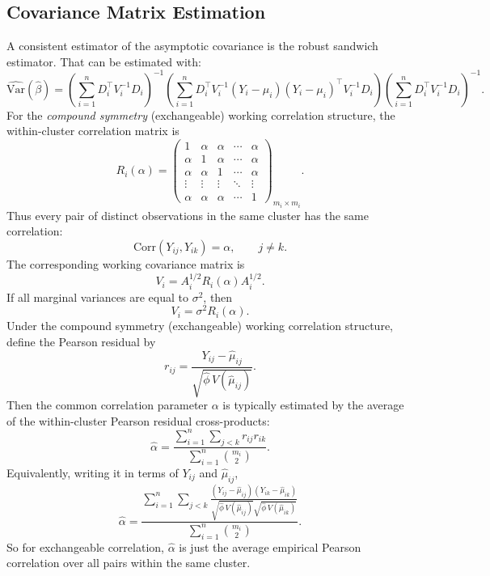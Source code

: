 \documentclass[11pt]{article}
\theoremstyle{definition}
\begin{document}
\subsection{Covariance Matrix Estimation}
A consistent estimator of the asymptotic covariance is the robust sandwich estimator. That can be estimated with:
\[
\widehat{\mathrm{Var}}(\hat\beta)
=
\left(\sum_{i=1}^n D_i^\top V_i^{-1} D_i\right)^{-1}
\left(\sum_{i=1}^n D_i^\top V_i^{-1}(Y_i-\mu_i)(Y_i-\mu_i)^\top V_i^{-1} D_i\right)
\left(\sum_{i=1}^n D_i^\top V_i^{-1} D_i\right)^{-1}.
\]
For the \emph{compound symmetry} (exchangeable) working correlation structure, the within-cluster correlation matrix is
\[
R_i(\alpha)=
\begin{pmatrix}
1 & \alpha & \alpha & \cdots & \alpha\\
\alpha & 1 & \alpha & \cdots & \alpha\\
\alpha & \alpha & 1 & \cdots & \alpha\\
\vdots & \vdots & \vdots & \ddots & \vdots\\
\alpha & \alpha & \alpha & \cdots & 1
\end{pmatrix}_{m_i\times m_i}.
\]
Thus every pair of distinct observations in the same cluster has the same correlation:
\[
\mathrm{Corr}(Y_{ij},Y_{ik})=\alpha,\qquad j\neq k.
\]
The corresponding working covariance matrix is
\[
V_i
=
A_i^{1/2}R_i(\alpha)A_i^{1/2}.
\]
If all marginal variances are equal to \(\sigma^2\), then
\[
V_i=\sigma^2 R_i(\alpha).
\]
Under the compound symmetry (exchangeable) working correlation structure, define the Pearson residual by
\[
r_{ij}
=
\frac{Y_{ij}-\hat\mu_{ij}}
{\sqrt{\hat\phi\,V(\hat\mu_{ij})}}.
\]
Then the common correlation parameter \(\alpha\) is typically estimated by the average of the within-cluster Pearson residual cross-products:
\[
\hat\alpha
=
\frac{\displaystyle \sum_{i=1}^n \sum_{j<k} r_{ij}r_{ik}}
{\displaystyle \sum_{i=1}^n \binom{m_i}{2}}.
\]
Equivalently, writing it in terms of \(Y_{ij}\) and \(\hat\mu_{ij}\),
\[
\hat\alpha
=
\frac{\displaystyle \sum_{i=1}^n \sum_{j<k}
\frac{(Y_{ij}-\hat\mu_{ij})(Y_{ik}-\hat\mu_{ik})}
{\sqrt{\hat\phi\,V(\hat\mu_{ij})}\sqrt{\hat\phi\,V(\hat\mu_{ik})}}}
{\displaystyle \sum_{i=1}^n \binom{m_i}{2}}.
\]
So for exchangeable correlation, \(\hat\alpha\) is just the average empirical Pearson correlation over all pairs within the same cluster.
\end{document}

